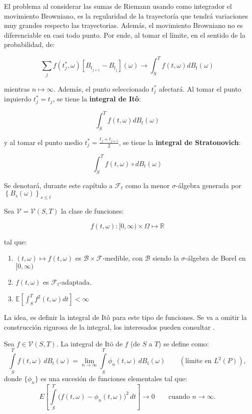 El problema al considerar las sumas de Riemann usando como integrador el movimiento Browniano, es la regularidad de la trayectoría que tendrá variaciones muy grandes respecto  las trayectorias. Además, el movimiento Browniano no es diferenciable en casi todo punto. Por ende, al tomar el límite, en el sentido de la probabilidad, de:

\[
	\sum_{j} f(t_j^*, \omega) [B_{t_{j+1}} - B_{t_j}](\omega) \rightarrow \int_S^T f(t, \omega) dB_t (\omega) 
\]

mientras $n \mapsto \infty$. Además, el punto seleccionado $t_j^*$ afectará. Al tomar el punto izquierdo $t_j^* =t_j$, se tiene la \textbf{integral de Itô}:

\[
	\int_S^T f(t, \omega) dB_t (\omega) 
\]

y al tomar el punto medio $t_j^* = \frac{t_j + t_{j + 1}}{2}$, se tiene la \textbf{integral de Stratonovich}:

\[
	\int_S^T f(t, \omega) \circ dB_t (\omega) 
\]

Se denotará, durante este capítulo a $\mathcal{F}_t$ como la menor $\sigma$-álgebra generada por $\left\{ B_s (\omega) \right\}_{s \leq t}$


\begin{boxDef}
	Sea $\mathcal{V} = \mathcal{V}(S,T)$ la clase de funciones:

	\[
		f(t, \omega): [0, \infty) \times \Omega \mapsto \mathbb{R}	
	\]

	tal que:

	\begin{enumerate}
		\item $(t, \omega) \mapsto f(t, \omega)$ es $\mathcal{B} \times \mathcal{F}$-medible, con $\mathcal{B}$ siendo la $\sigma$-álgebra de Borel en $[0, \infty)$
		\item $f(t, \omega)$ es $\mathcal{F}_t$-adaptada.
		\item $\mathbb{E}\left[ \int_S^T f^2 (t,\omega) dt \right] < \infty$ 
	\end{enumerate}

\end{boxDef}

La idea, es definir la integral de Itô para este tipo de funciones. Se va a omitir la construcción rigurosa de la integral, los interesados pueden consultar \cite{EDE_Oksendal}.


\begin{boxDef}
	Sea \( f \in \mathcal{V}(S, T) \). La integral de Itō de \( f \) (de \( S \) a \( T \)) se define como:
	\[
	\int\limits_{S}^{T} f(t, \omega) \, dB_{t}(\omega) = \lim_{n \to \infty} \int\limits_{S}^{T} \phi_{n}(t, \omega) \, dB_{t}(\omega) \qquad (\text{límite en } L^{2}(P)),
	\]
	donde \( \{\phi_{n}\} \) es una sucesión de funciones elementales tal que:
	\[
	E\left[ \int\limits_{S}^{T} \big(f(t, \omega) - \phi_{n}(t, \omega)\big)^{2} \, dt \right] \to 0 \qquad \text{cuando } n \to \infty.
	\]	
\end{boxDef}
	
